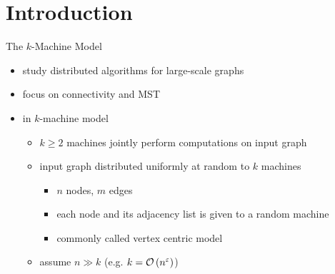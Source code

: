 \section{Introduction}
\begin{frame}{The $k$-Machine Model}
    \begin{itemize}
        \item study distributed algorithms for large-scale graphs
        \item focus on connectivity and MST
        \item in $k$-machine model
              \begin{itemize}
                  \item $k \geq 2$ machines jointly perform computations on input graph
                  \item input graph distributed uniformly at random to $k$ machines
                        \begin{itemize}
                            \item $n$ nodes, $m$ edges
                            \item each \alert{node} and its \alert{adjacency list} is given to a random machine
                            \item commonly called \alert{vertex centric} model
                        \end{itemize}
                  \item assume $n \gg k$ (e.g. $k = \mathcal{O}\left(n^{\varepsilon}\right)$)
              \end{itemize}
    \end{itemize}
\end{frame}


